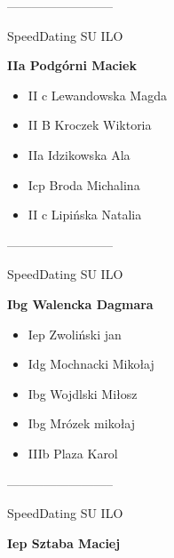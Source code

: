 \documentclass[a4paper,10pt]{article}
\begin{document}
\begin{multicols}{3}
\begin{minipage}[l]{\textwidth}
\begin{itemize}
    \end{itemize}



\end{minipage}



\begin{minipage}[l]{\textwidth}
--------------------------

  \footnotesize{SpeedDating SU ILO}

  \bfseries{IIa Podgórni Maciek}

  \begin{itemize}
    \item II c Lewandowska Magda
    \item II B Kroczek Wiktoria
    \item IIa Idzikowska Ala
    \item Icp Broda Michalina
    \item II c Lipińska Natalia

    \end{itemize}



\end{minipage}



\begin{minipage}[l]{\textwidth}
--------------------------

  \footnotesize{SpeedDating SU ILO}

  \bfseries{Ibg Walencka Dagmara}

  \begin{itemize}
    \item Iep Zwoliński jan
    \item Idg Mochnacki Mikołaj
    \item Ibg Wojdlski Miłosz
    \item Ibg Mrózek mikołaj
    \item IIIb Plaza Karol

    \end{itemize}



\end{minipage}



\begin{minipage}[l]{\textwidth}
--------------------------

  \footnotesize{SpeedDating SU ILO}

  \bfseries{Iep Sztaba Maciej}


\end{minipage}
\end{multicols}
\end{document}
